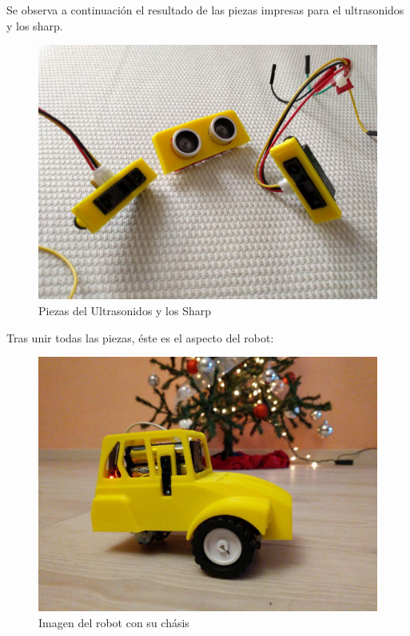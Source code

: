 \

\

Se observa a continuación el resultado de las piezas impresas para el ultrasonidos y los sharp.

\begin{figure}[h!]
  \centering
  \includegraphics[scale=0.30]{img/DCE1.jpg}
  \caption{Piezas del Ultrasonidos y los Sharp}
  \label{A}
\end{figure}

Tras unir todas las piezas, éste es el aspecto del robot:

\begin{figure}[h!]
  \centering
  \includegraphics[scale=0.30]{img/Caprito.jpg}
  \caption{Imagen del robot con su chásis}
  \label{A}
\end{figure}

